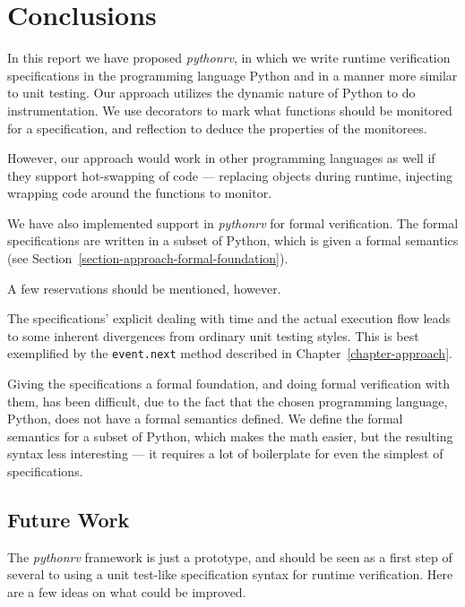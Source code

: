 
\pagestyle{newchap}
\chapter{Conclusions} \label{chapter-conclusions}

In this report we have proposed \textit{pythonrv}, in which we write runtime
verification specifications in the programming language Python and in a manner
more similar to unit testing. Our approach utilizes the dynamic nature of
Python to do instrumentation. We use decorators to mark what functions should
be monitored for a specification, and reflection to deduce the properties of
the monitorees.

However, our approach would work in other programming languages as well if they
support hot-swapping of code --- replacing objects during runtime, injecting
wrapping code around the functions to monitor.

We have also implemented support in \textit{pythonrv} for formal verification.
The formal specifications are written in a subset of Python, which is given a
formal semantics (see Section~\ref{section-approach-formal-foundation}).

A few reservations should be mentioned, however.

The specifications' explicit dealing with time and the actual execution flow
leads to some inherent divergences from ordinary unit testing styles. This is
best exemplified by the \texttt{event.next} method described in
Chapter~\ref{chapter-approach}.

Giving the specifications a formal foundation, and doing formal verification
with them, has been difficult, due to the fact that the chosen programming
language, Python, does not have a formal semantics defined. We define the
formal semantics for a subset of Python, which makes the math easier, but the
resulting syntax less interesting --- it requires a lot of boilerplate for even
the simplest of specifications.


\section{Future Work}

The \textit{pythonrv} framework is just a prototype, and should be seen as a
first step of several to using a unit test-like specification syntax for
runtime verification. Here are a few ideas on what could be improved.

